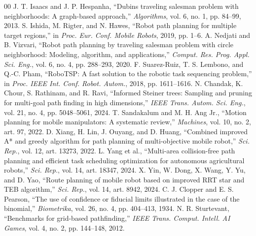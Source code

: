 \documentclass[conference]{IEEEtran}
\begin{document}
\begin{thebibliography}{00}
 J. T. Isaacs and J. P. Hespanha, ``Dubins traveling salesman problem with neighborhoods: A graph-based approach,'' \emph{Algorithms}, vol. 6, no. 1, pp. 84--99, 2013.
 S. Ishida, M. Rigter, and N. Hawes, ``Robot path planning for multiple target regions,'' in \emph{Proc. Eur. Conf. Mobile Robots}, 2019, pp. 1--6.
 A. Nedjati and B. Vizvari, ``Robot path planning by traveling salesman problem with circle neighborhood: Modeling, algorithm, and applications,'' \emph{Comput. Res. Prog. Appl. Sci. Eng.}, vol. 6, no. 4, pp. 288--293, 2020.
 F. Suarez-Ruiz, T. S. Lembono, and Q.-C. Pham, ``RoboTSP: A fast solution to the robotic task sequencing problem,'' in \emph{Proc. IEEE Int. Conf. Robot. Autom.}, 2018, pp. 1611--1616.
 N. Chandak, K. Chour, S. Rathinam, and R. Ravi, ``Informed Steiner trees: Sampling and pruning for multi-goal path finding in high dimensions,'' \emph{IEEE Trans. Autom. Sci. Eng.}, vol. 21, no. 4, pp. 5048--5061, 2024.
 T. Sandakalum and M. H. Ang Jr., ``Motion planning for mobile manipulators: A systematic review,'' \emph{Machines}, vol. 10, no. 2, art. 97, 2022.
 D. Xiang, H. Lin, J. Ouyang, and D. Huang, ``Combined improved A* and greedy algorithm for path planning of multi-objective mobile robot,'' \emph{Sci. Rep.}, vol. 12, art. 13273, 2022.
 L. Yang et al., ``Multi-area collision-free path planning and efficient task scheduling optimization for autonomous agricultural robots,'' \emph{Sci. Rep.}, vol. 14, art. 18347, 2024.
 X. Yin, W. Dong, X. Wang, Y. Yu, and D. Yao, ``Route planning of mobile robot based on improved RRT star and TEB algorithm,'' \emph{Sci. Rep.}, vol. 14, art. 8942, 2024.
 C. J. Clopper and E. S. Pearson, ``The use of confidence or fiducial limits illustrated in the case of the binomial,'' \emph{Biometrika}, vol. 26, no. 4, pp. 404--413, 1934.
 N. R. Sturtevant, ``Benchmarks for grid-based pathfinding,'' \emph{IEEE Trans. Comput. Intell. AI Games}, vol. 4, no. 2, pp. 144--148, 2012.
\end{thebibliography}
\end{document}
